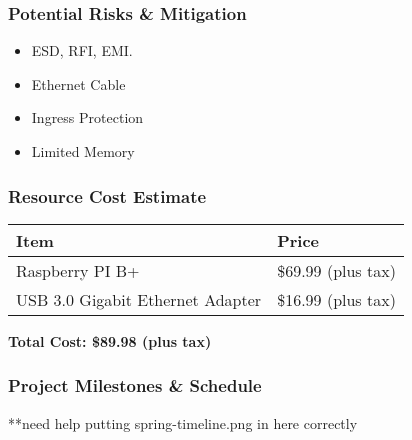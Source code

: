 \begin{frame}
\frametitle{Potential Risks \& Mitigation}


\begin{itemize}
    \item ESD, RFI, EMI.
    \item Ethernet Cable
    \item Ingress Protection
    \item Limited Memory
\end{itemize}

\end{frame}

\begin{frame}
\frametitle{Resource Cost Estimate}

\begin{center}

\begin{tabular}{l | l}
\toprule
\textbf{Item} & \textbf{Price} \\
\midrule
Raspberry PI B+ & \$69.99 (plus tax) \\
USB 3.0 Gigabit Ethernet Adapter & \$16.99 (plus tax) \\
\bottomrule
\end{tabular}

\hfill \break
\textbf{Total Cost: \$89.98 (plus tax)}
\end{center}


\end{frame}

\begin{frame}
\frametitle{Project Milestones \& Schedule}

**need help putting spring-timeline.png in here correctly

\end{frame}
